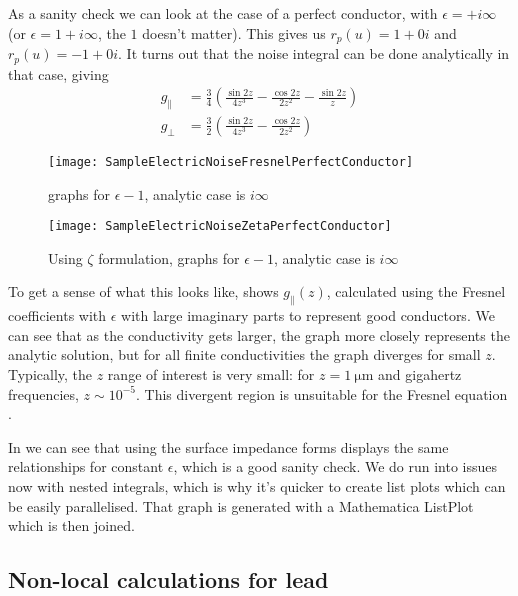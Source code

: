 \documentclass[11pt]{article}
\begin{document}
	As a sanity check we can look at the case of a perfect conductor, with $\epsilon = + i \infty$ (or $\epsilon = 1 + i \infty$, the $1$ doesn't matter).
	This gives us $r_p(u) = 1 + 0 i$ and $r_p(u) = -1 + 0 i$.
	It turns out that the noise integral can be done analytically in that case, giving
	\begin{align}
		g_{\parallel} &= \frac{3}{4} \left(\frac{\sin{2 z}}{4 z^3} - \frac{\cos{2 z}}{2 z^2} - \frac{\sin{2 z}}{z}\right) \\
		g_{\perp} &= \frac32 \left( \frac{\sin{2 z}}{4 z^3} - \frac{\cos{2 z}}{2 z^2} \right)
	\end{align}

	\begin{figure}[htp]
		\centering
		\texttt{[image: SampleElectricNoiseFresnelPerfectConductor]}
		\caption{graphs for $\epsilon - 1$, analytic case is $i \infty$} \label{fig:SampleElectricNoiseFresnelPerfect}
	\end{figure}

	\begin{figure}[htp]
		\centering
		\texttt{[image: SampleElectricNoiseZetaPerfectConductor]}
		\caption{Using $\zeta$ formulation, graphs for $\epsilon - 1$, analytic case is $i \infty$} \label{fig:SampleElectricNoiseZetaPerfect}
	\end{figure}

	To get a sense of what this looks like,  shows $g_{\parallel}(z)$, calculated using the Fresnel coefficients with $\epsilon$ with large imaginary parts to represent good conductors.
	We can see that as the conductivity gets larger, the graph more closely represents the analytic solution, but for all finite conductivities the graph diverges for small $z$.
	Typically, the $z$ range of interest is very small: for $z = \SI{1}{\micro\meter}$ and gigahertz frequencies, $z \sim 10^{-5}$.
	This divergent region is unsuitable for the Fresnel equation .

	In  we can see that using the surface impedance forms displays the same relationships for constant $\epsilon$, which is a good sanity check.
	We do run into issues now with nested integrals, which is why it's quicker to create list plots which can be easily parallelised.
	That graph is generated with a Mathematica ListPlot which is then joined.

	\subsection{Non-local calculations for lead} \label{subsec:sample:namresult}
\end{document}
